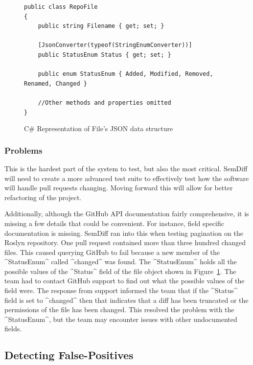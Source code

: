 \documentclass[draftclsnofoot,onecolumn]{IEEEtran}
\begin{document}
\begin{figure}[p]
\centering
\begin{lstlisting}
public class RepoFile
{
    public string Filename { get; set; }

    [JsonConverter(typeof(StringEnumConverter))]
    public StatusEnum Status { get; set; }

    public enum StatusEnum { Added, Modified, Removed, Renamed, Changed }
    
    //Other methods and properties omitted
}
\end{lstlisting}
\caption{ C\# Representation of File's JSON data structure}
\label{GitHubFiles}
\end{figure}



\subsubsection{Problems}

This is the hardest part of the system to test, but also the most critical. SemDiff will need to create a more advanced test suite to effectively test how the software will handle pull requests changing. Moving forward this will allow for better refactoring of the project.

Additionally, although the GitHub API documentation fairly comprehensive, it is missing a few details that could be convenient. For instance, field specific documentation is missing. SemDiff ran into this when testing pagination on the Roslyn repository. One pull request contained more than three hundred changed files. This caused querying GitHub to fail because a new member of the ^StatusEnum^ called ^changed^ was found. The ^StatusEnum^ holds all the possible values of the ^Status^ field of the file object shown in Figure~\ref{GitHubFiles}. The team had to contact GitHub support to find out what the possible values of the field were. The response from support informed the team that if the ^Status^ field is set to ^changed^ then that indicates that a diff has been truncated or the permissions of the file has been changed. This resolved the problem with the ^StatusEnum^, but the team may encounter issues with other undocumented fields.

\subsection{Detecting False-Positives}%
\end{document}
